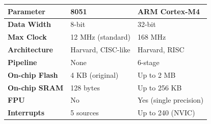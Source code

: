 \documentclass[12pt,a4paper]{article}
\renewcommand{\arraystretch}{1.45}
\begin{document}
\begin{tcolorbox}[tikzbox, title={8051 vs.\ ARM Cortex-M --- At a Glance}]
\par\noindent
{\renewcommand{\arraystretch}{1.55}%
\begin{tabularx}{\linewidth}{|B{2.8cm}|Y|Y|}
\hline
\textbf{Parameter} & \textbf{8051} & \textbf{ARM Cortex-M4} \\
\hline
\textbf{Data Width} & 8-bit & 32-bit \\
\hline
\textbf{Max Clock} & 12 MHz (standard) & 168 MHz \\
\hline
\textbf{Architecture} & Harvard, CISC-like & Harvard, RISC \\
\hline
\textbf{Pipeline} & None & 6-stage \\
\hline
\textbf{On-chip Flash} & 4 KB (original) & Up to 2 MB \\
\hline
\textbf{On-chip SRAM} & 128 bytes & Up to 256 KB \\
\hline
\textbf{FPU} & No & Yes (single precision) \\
\hline
\textbf{Interrupts} & 5 sources & Up to 240 (NVIC) \\
\hline
\end{tabularx}}
\end{tcolorbox}
\end{document}
